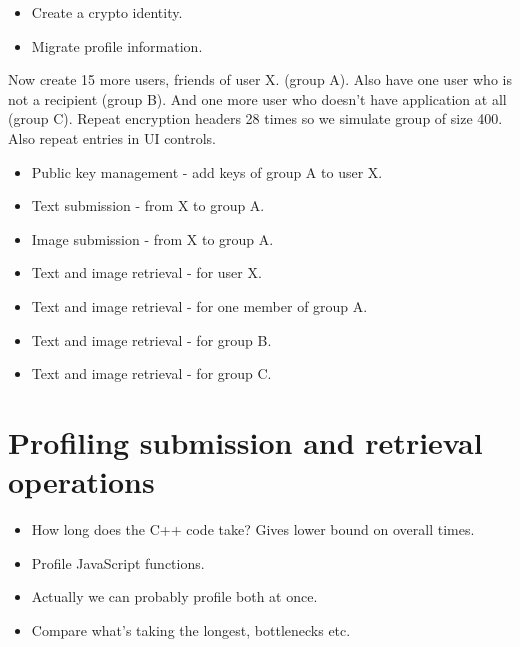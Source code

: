 \begin{itemize}
    \item Create a crypto identity.
    \item Migrate profile information.
\end{itemize}

Now create 15 more users, friends of user X. (group A). Also have one user who is not a recipient (group B). And one more user who doesn't have application at all (group C). Repeat encryption headers 28 times so we simulate group of size 400. Also repeat entries in UI controls.

\begin{itemize}
    \item Public key management - add keys of group A to user X.
    \item Text submission - from X to group A.
    \item Image submission - from X to group A.
    \item Text and image retrieval - for user X.
    \item Text and image retrieval - for one member of group A.
    \item Text and image retrieval - for group B.
    \item Text and image retrieval - for group C.
\end{itemize}

\section{Profiling submission and retrieval operations}

\begin{itemize}
    \item How long does the C++ code take? Gives lower bound on overall times.
    \item Profile JavaScript functions.
    \item Actually we can probably profile both at once.
    \item Compare what's taking the longest, bottlenecks etc.
\end{itemize}